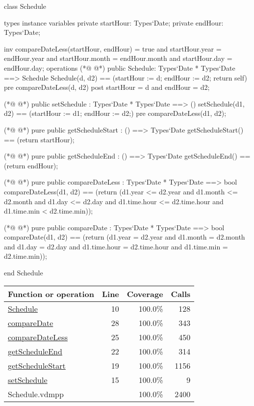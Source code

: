\begin{vdmpp}[breaklines=true]
class Schedule

types
instance variables
  private startHour: Types`Date;
  private endHour: Types`Date;
  
  inv compareDateLess(startHour, endHour) = true and startHour.year = endHour.year and startHour.month = endHour.month and startHour.day = endHour.day;
operations 
(*@
\label{Schedule:10}
@*)
 public Schedule: Types`Date * Types`Date ==> Schedule
  Schedule(d, d2) == (startHour := d; endHour := d2; return self)
 pre compareDateLess(d, d2)
 post startHour = d and endHour = d2;
 
(*@
\label{setSchedule:15}
@*)
 public setSchedule : Types`Date * Types`Date ==> ()
  setSchedule(d1, d2) == (startHour := d1; endHour := d2;)
 pre compareDateLess(d1, d2);
  
(*@
\label{getScheduleStart:19}
@*)
 pure public getScheduleStart : () ==> Types`Date
  getScheduleStart() == (return startHour);
  
(*@
\label{getScheduleEnd:22}
@*)
 pure public getScheduleEnd : () ==> Types`Date
  getScheduleEnd() == (return endHour);
  
(*@
\label{compareDateLess:25}
@*)
 pure public compareDateLess : Types`Date * Types`Date ==> bool
  compareDateLess(d1, d2) == (return (d1.year <= d2.year and d1.month <= d2.month and d1.day <= d2.day and d1.time.hour <= d2.time.hour and d1.time.min < d2.time.min));
  
(*@
\label{compareDate:28}
@*)
 pure public compareDate : Types`Date * Types`Date ==> bool
  compareDate(d1, d2) == (return (d1.year = d2.year and d1.month = d2.month and d1.day = d2.day and d1.time.hour = d2.time.hour and d1.time.min = d2.time.min));

end Schedule
\end{vdmpp}
\bigskip
\begin{longtable}{|l|r|r|r|}
\hline
Function or operation & Line & Coverage & Calls \\
\hline
\hline
\hyperref[Schedule:10]{Schedule} & 10&100.0\% & 128 \\
\hline
\hyperref[compareDate:28]{compareDate} & 28&100.0\% & 343 \\
\hline
\hyperref[compareDateLess:25]{compareDateLess} & 25&100.0\% & 450 \\
\hline
\hyperref[getScheduleEnd:22]{getScheduleEnd} & 22&100.0\% & 314 \\
\hline
\hyperref[getScheduleStart:19]{getScheduleStart} & 19&100.0\% & 1156 \\
\hline
\hyperref[setSchedule:15]{setSchedule} & 15&100.0\% & 9 \\
\hline
\hline
Schedule.vdmpp & & 100.0\% & 2400 \\
\hline
\end{longtable}

